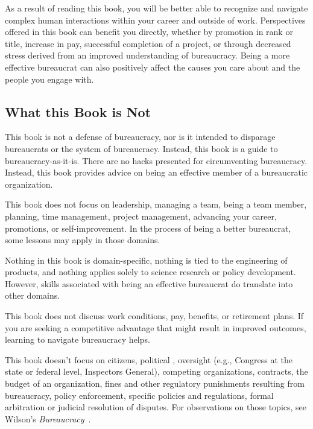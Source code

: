 As a result of reading this book, you will be better able to recognize and navigate complex human interactions within your career and outside of work. Perspectives offered in this book can benefit you directly, whether by promotion in rank or title, increase in pay, successful completion of a project, or through decreased stress derived from an improved understanding of  bureaucracy. Being a more effective bureaucrat can also positively affect the causes you care about and the people you engage with.


\subsection*{What this Book is Not}

This book is not a defense of bureaucracy, nor is it intended to disparage bureaucrats or the system of bureaucracy. Instead, this book is a guide to bureaucracy-as-it-is. There are no hacks presented for circumventing bureaucracy. Instead, this book provides advice on being an effective member of a bureaucratic organization.

This book does not focus on leadership, managing a team, being a team member, planning, time management, project management, advancing your career, promotions, or self-improvement. In the process of being a better bureaucrat, some lessons may apply in those domains.


Nothing in this book is domain-specific, nothing is tied to the engineering of products, and nothing applies solely to science research or policy development. However, skills associated with being an effective bureaucrat do translate into other domains.


This book does not discuss work conditions, pay, benefits, or retirement plans. If you are seeking a competitive advantage that might result in improved outcomes, learning to navigate bureaucracy helps.


This book doesn't focus on citizens, political 
\iftoggle{glossarysubstitutionworks}{\glspl{policymaker}}{policymakers}, oversight (e.g., Congress at the state or federal level, Inspectors General), 
competing organizations, contracts, the budget of an organization, fines and other regulatory punishments resulting from bureaucracy, policy enforcement, specific policies and regulations, formal arbitration or judicial resolution of disputes. For observations on those topics, see Wilson's \textit{Bureaucracy}~\cite{1991_Wilson}. 


